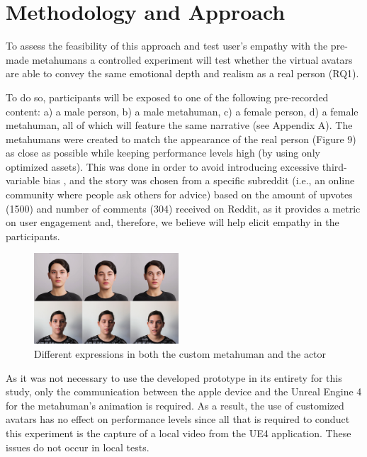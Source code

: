\section{Methodology and Approach}
To assess the feasibility of this approach and test user's empathy with the pre-made metahumans a controlled experiment will test whether the virtual avatars are able to convey the same emotional depth and realism as a real person (RQ1).

To do so, participants will be exposed to one of the following pre-recorded content: a) a male person, b) a male metahuman, c) a female person, d) a female metahuman, all of which will feature the same narrative (see Appendix A). The metahumans were created to match the appearance of the real person (Figure 9) as close as possible while keeping performance levels high (by using only optimized assets). This was done in order to avoid introducing excessive third-variable bias \cite{ROT19}, and the story was chosen from a specific subreddit (i.e., an online community where people ask others for advice) based on the amount of upvotes (1500) and number of comments (304) received on Reddit, as it provides a metric on user engagement and, therefore, we believe will help elicit empathy in the participants.


\begin{figure}[h!]
\includegraphics[width=0.48\textwidth]{figures/personavatar.jpg}
\centering
\caption{Different expressions in both the custom metahuman and the actor}
\end{figure}

As it was not necessary to use the developed prototype in its entirety for this study, only the communication between the apple device and the Unreal Engine 4 for the metahuman's animation is required. As a result, the use of customized avatars has no effect on performance levels since all that is required to conduct this experiment is the capture of a local video from the UE4 application. These issues do not occur in local tests.

